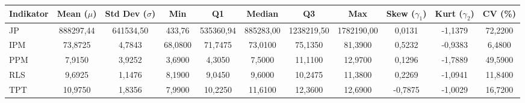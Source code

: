 \begin{adjustbox}{max width=\textwidth}
\small
\begin{tabular}{|>{\centering\arraybackslash}p{2.5cm}|c|c|c|c|c|c|c|c|c|c|}
\hline
\textbf{Indikator} & \textbf{Mean ($\mu$)} & \textbf{Std Dev ($\sigma$)} & \textbf{Min} & \textbf{Q1} & \textbf{Median} & \textbf{Q3} & \textbf{Max} & \textbf{Skew ($\gamma_1$)} & \textbf{Kurt ($\gamma_2$)} & \textbf{CV (\%)} \\
\hline
JP & 888297,44 & 641534,50 & 433,76 & 535360,94 & 885283,00 & 1238219,50 & 1782190,00 & 0,0131 & -1,1379 & 72,2200 \\
IPM & 73,8725 & 4,7843 & 68,0800 & 71,7475 & 73,0100 & 75,1350 & 81,3900 & 0,5232 & -0,9383 & 6,4800 \\
PPM & 7,9150 & 3,9252 & 3,6900 & 4,3050 & 7,5000 & 11,1100 & 12,9700 & 0,1296 & -1,7889 & 49,5900 \\
RLS & 9,6925 & 1,1476 & 8,1900 & 9,0450 & 9,6000 & 10,2475 & 11,3800 & 0,2269 & -1,0941 & 11,8400 \\
TPT & 10,9750 & 1,8356 & 7,9900 & 10,2250 & 11,6100 & 12,3600 & 12,6900 & -0,7875 & -1,0029 & 16,7200 \\
\hline
\end{tabular}
\end{adjustbox}
